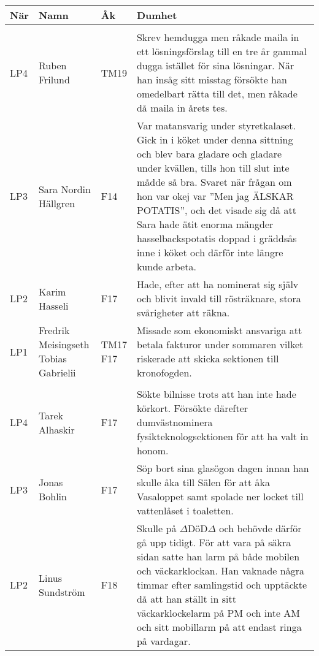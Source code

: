 \documentclass[a4paper]{article}
\begin{document}
\begin{longtable}{p{5mm}>{\raggedright\arraybackslash}p{30mm}p{10mm}p{108mm}}
\textbf{När} & \textbf{Namn} & \textbf{Åk} & \textbf{Dumhet}\\ \hline

\rowcolor{veryLightGray} \multicolumn{4}{l}{\textbf{2019/2020}} \\ \hline

LP4 & Ruben Frilund & TM19 & Skrev hemdugga men råkade maila in ett lösningsförslag till en tre år gammal dugga istället för sina lösningar. När han insåg sitt misstag försökte han omedelbart rätta till det, men råkade då maila in årets tes.
\\ \hline

LP3 & Sara Nordin Hällgren & F14 & Var matansvarig under styretkalaset. Gick in i köket under denna sittning och blev bara gladare och gladare under kvällen, tills hon till slut inte mådde så bra. Svaret när frågan om hon var okej var ''Men jag ÄLSKAR POTATIS'', och det visade sig då att Sara hade ätit enorma mängder hasselbackspotatis doppad i gräddsås inne i köket och därför inte längre kunde arbeta.
\\ \hline

LP2 & Karim Hasseli & F17 & Hade, efter att ha nominerat sig själv och blivit invald till rösträknare, stora svårigheter att räkna.
\\ \hline

LP1 & \makecell{Fredrik Meisingseth \\ Tobias Gabrielii} & \makecell{TM17 \\ F17} & Missade som ekonomiskt ansvariga att betala fakturor under sommaren vilket riskerade att skicka sektionen till kronofogden.
\\ \hline

\rowcolor{veryLightGray} \multicolumn{4}{l}{\textbf{2018/2019}} \\ \hline

LP4 & Tarek Alhaskir & F17 & Sökte bilnisse trots att han inte hade körkort. Försökte därefter dumvästnominera fysikteknologsektionen för att ha valt in honom. 
\\ \hline

LP3 & Jonas Bohlin & F17 & Söp bort sina glasögon dagen innan han skulle åka till Sälen för att åka Vasaloppet samt spolade ner locket till vattenlåset i toaletten. \\ \hline

LP2 & Linus Sundström & F18 & Skulle på $\Delta$DöD$\Delta$ och behövde därför gå upp tidigt. För att vara på säkra sidan satte han larm på både mobilen och väckarklockan. Han vaknade några timmar efter samlingstid och upptäckte då att han ställt in sitt väckarklockelarm på PM och inte AM och sitt mobillarm på att endast ringa på vardagar. \\ \hline


\end{longtable}
\end{document}
